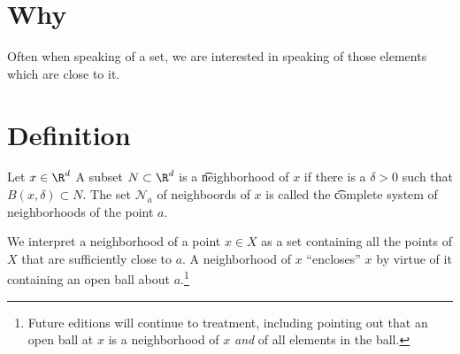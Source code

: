 
\section*{Why}

Often when speaking of a set, we are interested in speaking of those elements which are close to it.

\section*{Definition}

Let $x \in \R ^d$
A subset $N \subset \R ^d$ is a \t{neighborhood of $x$} if there is a $\delta  > 0$ such that $B(x, \delta ) \subset N$.
The set $\mathcal{N} _a$ of neighboords of $x$ is called the \t{complete system of neighborhoods} of the point $a$.

We interpret a neighborhood of a point $x \in X$ as a set containing all the points of $X$ that are sufficiently close to $a$.
A neighborhood of $x$ ``encloses'' $x$ by virtue of it containing an open ball about $a$.\footnote{Future editions will continue to treatment, including pointing out that an open ball at $x$ is a neighborhood of $x$ \textit{and} of all elements in the ball.}

\blankpage